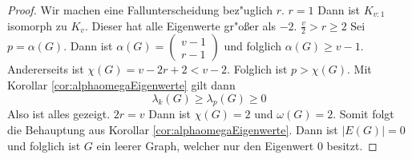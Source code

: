  \begin{proof}
   Wir machen eine Fallunterscheidung bez"uglich $r$. 
    {$r=1$} Dann ist $K_{v:1}$ isomorph zu $K_v$. Dieser hat alle Eigenwerte gr"o{\ss}er als $-2$.
  {$\frac{v}{2} >  r \geq 2$} Sei $p = \alpha(G)$.  Dann ist $\alpha(G) = \begin{pmatrix}
   v-1 \\ r-1
 \end{pmatrix}$ und folglich $ \alpha (G) \geq v-1$. Andererseits ist $\chi(G) = v-2r+2 < v-2$. Folglich ist $p > \chi(G)$. Mit  Korollar \ref{cor:alphaomegaEigenwerte} gilt dann \begin{equation*}
   \lambda_{k}(G) \geq \lambda_{p}(G) \geq 0
 \end{equation*}
  Also ist alles gezeigt.
   {$2r = v $} Dann ist $\chi(G) = 2$ und $\omega(G) =2$. Somit folgt die Behauptung aus Korollar \ref{cor:alphaomegaEigenwerte}. 
   Dann ist $|E(G)| = 0$ und folglich ist $G$ ein leerer Graph, welcher nur den Eigenwert $0$ besitzt.
 \end{proof}

